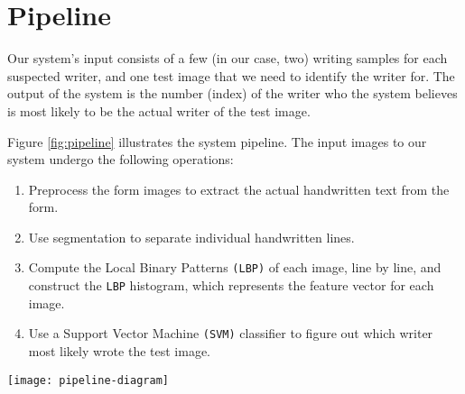 \section{Pipeline}
Our system's input consists of a few (in our case, two) writing samples for each suspected writer, and one test image that we need to identify the writer for. The output of the system is the number (index) of the writer who the system believes is most likely to be the actual writer of the test image.

Figure \ref{fig:pipeline} illustrates the system pipeline. The input images to our system undergo the following operations:
\begin{enumerate}
    \item Preprocess the form images to extract the actual handwritten text from the form.
    \item Use segmentation to separate individual handwritten lines.
    \item Compute the Local Binary Patterns \texttt{(LBP)} of each image, line by line, and construct the \texttt{LBP} histogram, which represents the feature vector for each image.
    \item Use a Support Vector Machine \texttt{(SVM)} classifier to figure out which writer most likely wrote the test image.
\end{enumerate}

\begin{figure*}[]
    \centering
    \texttt{[image: pipeline-diagram]}
    \label{fig:pipeline}
\end{figure*}


